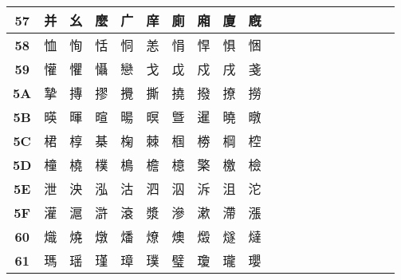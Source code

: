 \begin{table}[H]
\begin{tabular}{|Sc|Sc|Sc|Sc|Sc|Sc|Sc|Sc|Sc|Sc|}
\textbf{57} & 并 & 幺 & 麼 & 广 & 庠 & 廁 & 廂 & 廈 & 廐 \\ \hline
\textbf{58} & 恤 & 恂 & 恬 & 恫 & 恙 & 悁 & 悍 & 惧 & 悃 \\ \hline
\textbf{59} & 懽 & 懼 & 懾 & 戀 & 戈 & 戉 & 戍 & 戌 & 戔 \\ \hline
\textbf{5A} & 摯 & 摶 & 摎 & 攪 & 撕 & 撓 & 撥 & 撩 & 撈 \\ \hline
\textbf{5B} & 暎 & 暉 & 暄 & 暘 & 暝 & 曁 & 暹 & 曉 & 暾 \\ \hline
\textbf{5C} & 桾 & 椁 & 棊 & 椈 & 棘 & 椢 & 椦 & 棡 & 椌 \\ \hline
\textbf{5D} & 橦 & 橈 & 樸 & 樢 & 檐 & 檍 & 檠 & 檄 & 檢 \\ \hline
\textbf{5E} & 泄 & 泱 & 泓 & 沽 & 泗 & 泅 & 泝 & 沮 & 沱 \\ \hline
\textbf{5F} & 灌 & 滬 & 滸 & 滾 & 漿 & 滲 & 漱 & 滯 & 漲 \\ \hline
\textbf{60} & 熾 & 燒 & 燉 & 燔 & 燎 & 燠 & 燬 & 燧 & 燵 \\ \hline
\textbf{61} & 瑪 & 瑶 & 瑾 & 璋 & 璞 & 璧 & 瓊 & 瓏 & 瓔 \\ \hline
\end{tabular}
\end{table}

